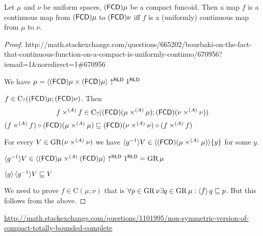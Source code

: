 \begin{thm}
  Let $\mu$ and $\nu$ be uniform spaces, $(\mathsf{FCD})
  \mu$ be a compact funcoid. Then a map $f$ is a continuous map from
  $(\mathsf{FCD}) \mu$ to $(\mathsf{FCD}) \nu$ iff $f$ is
  a (uniformly) continuous map from $\mu$ to $\nu$.
\end{thm}

\begin{proof}

http://math.stackexchange.com/questions/665202/bourbaki-on-the-fact-that-continuous-function-on-a-compact-is-uniformly-continuo/670956?iemail=1\&noredirect=1\#670956

We have $\mu= \langle (\mathsf{FCD}) \mu \times
(\mathsf{FCD}) \mu \rangle \uparrow^{\mathsf{RLD}} 1^{\mathsf{RLD}}$

$f \in \mathrm{C}_? ((\mathsf{FCD}) \mu; (\mathsf{FCD})
\nu)$. Then
\[ f \times^{(A)} f \in \mathrm{C}_? ((\mathsf{FCD}) (\mu \times^{(A)}
   \mu) ; (\mathsf{FCD}) (\nu \times^{(A)} \nu)) \]
$(f \times^{(A)} f) \circ (\mathsf{FCD}) (\mu \times^{(A)} \mu)
\sqsubseteq (\mathsf{FCD}) (\nu \times^{(A)} \nu) \circ (f \times^{(A)} f)$

For every $V \in \operatorname{GR} (\nu \times^{(A)} \nu)$ we have $\langle g^{- 1} \rangle
V \in \langle (\mathsf{FCD}) (\mu \times^{(A)} \mu) \rangle
\{ y \}$ for some $y$.

$\langle g^{- 1} \rangle V \in \langle (\mathsf{FCD}) \mu \times^{(A)}
(\mathsf{FCD}) \mu \rangle \uparrow^{\mathsf{RLD}} 1^{\mathsf{RLD}}
= \operatorname{GR} \mu$

$\left\langle g\right\rangle \langle g^{- 1} \rangle V \sqsubseteq V$

We need to prove $f \in \mathrm{C} (\mu; \nu)$ that is $\forall p \in
\operatorname{GR} \nu \exists q \in \operatorname{GR} \mu: \left\langle f\right\rangle q
\sqsubseteq p$. But this follows from the above.
\end{proof}


\url{http://math.stackexchange.com/questions/1101995/non-symmetric-version-of-compact-totally-bounded-complete}
